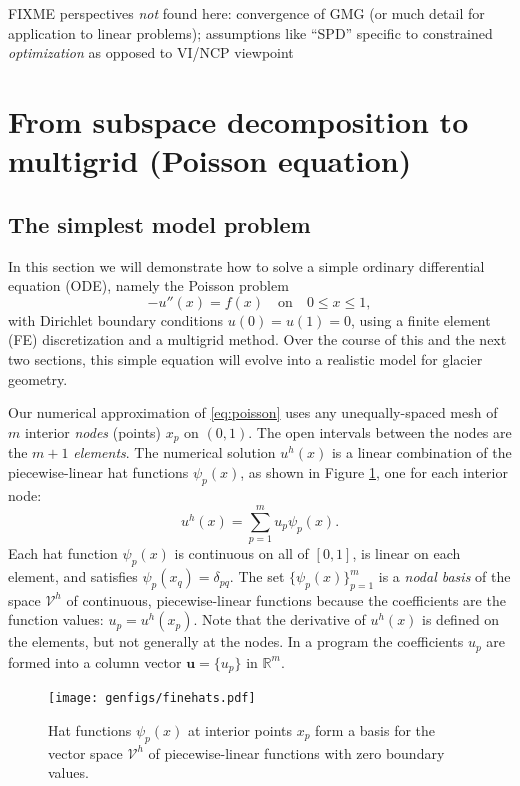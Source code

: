 \documentclass[letterpaper,final,12pt,reqno]{amsart}
\newcommand{\RR}{\mathbb{R}}
\newcommand{\bu}{\mathbf{u}}
\numberwithin{equation}{section}
\numberwithin{figure}{section}
\numberwithin{table}{section}
\begin{document}
FIXME perspectives \emph{not} found here: convergence of GMG (or much detail for application to linear problems); assumptions like ``SPD'' specific to constrained \emph{optimization} as opposed to VI/NCP viewpoint


\section{From subspace decomposition to multigrid (Poisson equation)} \label{sec:subspace}

\subsection*{The simplest model problem}  In this section we will demonstrate how to solve a simple ordinary differential equation (ODE), namely the Poisson problem
\begin{equation}
- u''(x) = f(x) \quad \text{on} \quad 0 \le x \le 1, \label{eq:poisson}
\end{equation}
with Dirichlet boundary conditions $u(0)=u(1)=0$, using a finite element (FE) discretization and a multigrid method.  Over the course of this and the next two sections, this simple equation will evolve into a realistic model for glacier geometry.

Our numerical approximation of \eqref{eq:poisson} uses any unequally-spaced mesh of $m$ interior \emph{nodes} (points) $x_p$ on $(0,1)$.  The open intervals between the nodes are the $m+1$ \emph{elements}.  The numerical solution $u^h(x)$ is a linear combination of the piecewise-linear hat functions $\psi_p(x)$, as shown in Figure \ref{fig:finehats}, one for each interior node:
\begin{equation}
u^h(x) = \sum_{p=1}^m u_p \psi_p(x). \label{eq:trialsolution}
\end{equation}
Each hat function $\psi_p(x)$ is continuous on all of $[0,1]$, is linear on each element, and satisfies $\psi_p(x_q) = \delta_{pq}$.  The set $\{\psi_p(x)\}_{p=1}^m$ is a \emph{nodal basis} of the space $\mathcal{V}^h$ of continuous, piecewise-linear functions because the coefficients are the function values: $u_p=u^h(x_p)$.  Note that the derivative of $u^h(x)$ is defined on the elements, but not generally at the nodes.  In a program the coefficients $u_p$ are formed into a column vector $\bu=\{u_p\}$ in $\RR^m$.

\begin{figure}
\texttt{[image: genfigs/finehats.pdf]}
\caption{Hat functions $\psi_p(x)$ at interior points $x_p$ form a basis for the vector space $\mathcal{V}^h$ of piecewise-linear functions  with zero boundary values.}
\label{fig:finehats}
\end{figure}
\end{document}
